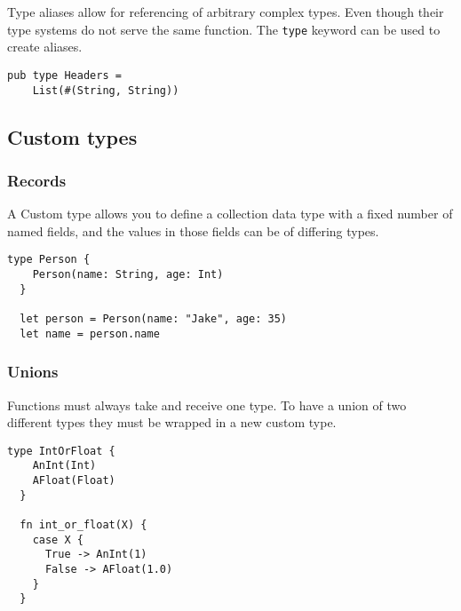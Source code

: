 Type aliases allow for referencing of arbitrary complex types. Even though 
their type systems do not serve the same function. The \lstinline[language=Gleam, basicstyle=\small]!type!
keyword can be used to create aliases.

\begin{lstlisting}[belowskip=-\baselineskip]
  pub type Headers =
    List(#(String, String))
\end{lstlisting}

\vs
\subsection*{\rmfamily Custom types}

\vs
\subsubsection*{\rmfamily Records}

A Custom type allows you to define a collection data type with a fixed number of 
named fields, and the values in those fields can be of differing types.

\begin{lstlisting}[belowskip=-\baselineskip]
  type Person {
    Person(name: String, age: Int)
  }
  
  let person = Person(name: "Jake", age: 35)
  let name = person.name
\end{lstlisting}

\vs
\subsubsection*{\rmfamily Unions}

Functions must always take and receive one type. To have a union of
two different types they must be wrapped in a new custom type.

\begin{lstlisting}[belowskip=-\baselineskip]
  type IntOrFloat {
    AnInt(Int)
    AFloat(Float)
  }
  
  fn int_or_float(X) {
    case X {
      True -> AnInt(1)
      False -> AFloat(1.0)
    }
  }
\end{lstlisting}

\vs
